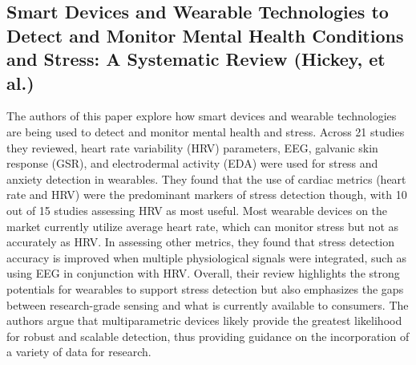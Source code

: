 \documentclass[12pt,letterpaper]{article}
\begin{document}
\subsection{Smart Devices and Wearable Technologies to Detect and Monitor Mental Health Conditions and Stress: A Systematic Review (Hickey, et al.)}
The authors of this paper explore how smart devices and wearable technologies are being used to detect and monitor mental health and stress. Across 21 studies they reviewed, heart rate variability (HRV) parameters, EEG, galvanic skin response (GSR), and electrodermal activity (EDA) were used for stress and anxiety detection in wearables. They found that the use of cardiac metrics (heart rate and HRV) were the predominant markers of stress detection though, with 10 out of 15 studies assessing HRV as most useful. Most wearable devices on the market currently utilize average heart rate, which can monitor stress but not as accurately as HRV. In assessing other metrics, they found that stress detection accuracy is improved when multiple physiological signals were integrated, such as using EEG in conjunction with HRV. Overall, their review highlights the strong potentials for wearables to support stress detection but also emphasizes the gaps between research-grade sensing and what is currently available to consumers. The authors argue that multiparametric devices likely provide the greatest likelihood for robust and scalable detection, thus providing guidance on the incorporation of a variety of data for research.
\end{document}
